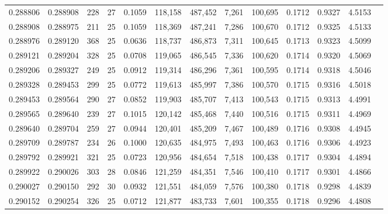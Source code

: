 \begin{tabular}{rrrrrrrrrrrrr}
0.288806 & 0.288908 &   228 &  27 &                                     0.1059 & 118,158 & 487,452 &   7,261 & 100,695 & 0.1712 & 0.9327 & 4.5153 \\
0.288908 & 0.288975 &   211 &  25 &                                     0.1059 & 118,369 & 487,241 &   7,286 & 100,670 & 0.1712 & 0.9325 & 4.5133 \\
0.288976 & 0.289120 &   368 &  25 &                                     0.0636 & 118,737 & 486,873 &   7,311 & 100,645 & 0.1713 & 0.9323 & 4.5099 \\
0.289121 & 0.289204 &   328 &  25 &                                     0.0708 & 119,065 & 486,545 &   7,336 & 100,620 & 0.1714 & 0.9320 & 4.5069 \\
0.289206 & 0.289327 &   249 &  25 &                                     0.0912 & 119,314 & 486,296 &   7,361 & 100,595 & 0.1714 & 0.9318 & 4.5046 \\
0.289328 & 0.289453 &   299 &  25 &                                     0.0772 & 119,613 & 485,997 &   7,386 & 100,570 & 0.1715 & 0.9316 & 4.5018 \\
0.289453 & 0.289564 &   290 &  27 &                                     0.0852 & 119,903 & 485,707 &   7,413 & 100,543 & 0.1715 & 0.9313 & 4.4991 \\
0.289565 & 0.289640 &   239 &  27 &                                     0.1015 & 120,142 & 485,468 &   7,440 & 100,516 & 0.1715 & 0.9311 & 4.4969 \\
0.289640 & 0.289704 &   259 &  27 &                                     0.0944 & 120,401 & 485,209 &   7,467 & 100,489 & 0.1716 & 0.9308 & 4.4945 \\
0.289709 & 0.289787 &   234 &  26 &                                     0.1000 & 120,635 & 484,975 &   7,493 & 100,463 & 0.1716 & 0.9306 & 4.4923 \\
0.289792 & 0.289921 &   321 &  25 &                                     0.0723 & 120,956 & 484,654 &   7,518 & 100,438 & 0.1717 & 0.9304 & 4.4894 \\
0.289922 & 0.290026 &   303 &  28 &                                     0.0846 & 121,259 & 484,351 &   7,546 & 100,410 & 0.1717 & 0.9301 & 4.4866 \\
0.290027 & 0.290150 &   292 &  30 &                                     0.0932 & 121,551 & 484,059 &   7,576 & 100,380 & 0.1718 & 0.9298 & 4.4839 \\
0.290152 & 0.290254 &   326 &  25 &                                     0.0712 & 121,877 & 483,733 &   7,601 & 100,355 & 0.1718 & 0.9296 & 4.4808 \\

\end{tabular}
